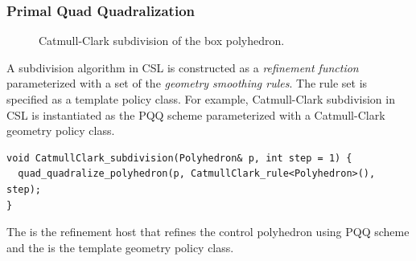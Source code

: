 

\subsubsection*{Primal Quad Quadralization}

\begin{figure}[htb]
    \caption{Catmull-Clark subdivision of the box polyhedron.}
    \label{fig:cc}
\end{figure}

A subdivision algorithm in CSL is constructed as a
\emph{refinement function} parameterized with a set of the  
\emph{geometry smoothing rules}. The rule set is specified as
a template policy class. For example, Catmull-Clark
subdivision in CSL is instantiated as the PQQ scheme 
parameterized with a Catmull-Clark geometry policy class.
\begin{lstlisting}
void CatmullClark_subdivision(Polyhedron& p, int step = 1) {
  quad_quadralize_polyhedron(p, CatmullClark_rule<Polyhedron>(), step);
}
\end{lstlisting}
The  is the refinement host
that refines the control polyhedron using PQQ scheme and the  
 is the template geometry policy class.
\\


